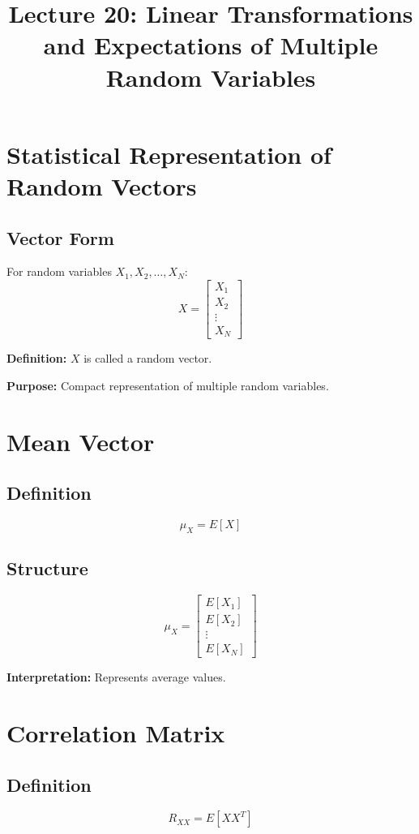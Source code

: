 \documentclass{article}
\title{Lecture 20: Linear Transformations and Expectations of Multiple Random Variables}
\date{}
\begin{document}
\maketitle

\section{Statistical Representation of Random Vectors}

\subsection{Vector Form}

For random variables $X_1, X_2, \dots, X_N$:
\[
X =
\begin{bmatrix}
X_1 \\
X_2 \\
\vdots \\
X_N
\end{bmatrix}
\]

\textbf{Definition:} $X$ is called a random vector.

\textbf{Purpose:} Compact representation of multiple random variables.

\section{Mean Vector}

\subsection{Definition}
\[
\mu_X = E[X]
\]

\subsection{Structure}
\[
\mu_X =
\begin{bmatrix}
E[X_1] \\
E[X_2] \\
\vdots \\
E[X_N]
\end{bmatrix}
\]

\textbf{Interpretation:} Represents average values.

\section{Correlation Matrix}

\subsection{Definition}
\[
R_{XX} = E[XX^T]
\]
\end{document}

